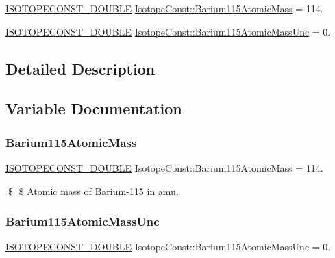 \begin{DoxyCompactItemize}
\item 
\mbox{\hyperlink{group___isotope_const-_macros_ga8f45a7272ce02c0b4c65c44636ed719a}{I\+S\+O\+T\+O\+P\+E\+C\+O\+N\+S\+T\+\_\+\+D\+O\+U\+B\+LE}} \mbox{\hyperlink{group___isotope_const-_barium-_ba115_ga425e8ef7e29b70828f740eba21984690}{Isotope\+Const\+::\+Barium115\+Atomic\+Mass}} = 114.
\item 
\mbox{\hyperlink{group___isotope_const-_macros_ga8f45a7272ce02c0b4c65c44636ed719a}{I\+S\+O\+T\+O\+P\+E\+C\+O\+N\+S\+T\+\_\+\+D\+O\+U\+B\+LE}} \mbox{\hyperlink{group___isotope_const-_barium-_ba115_ga1510a917f523909d1b656311b68f2081}{Isotope\+Const\+::\+Barium115\+Atomic\+Mass\+Unc}} = 0.
\end{DoxyCompactItemize}


\subsection{Detailed Description}


\subsection{Variable Documentation}
\mbox{\label{group___isotope_const-_barium-_ba115_ga425e8ef7e29b70828f740eba21984690}} 
\subsubsection{\texorpdfstring{Barium115\+Atomic\+Mass}{Barium115AtomicMass}}
{\footnotesize\ttfamily \mbox{\hyperlink{group___isotope_const-_macros_ga8f45a7272ce02c0b4c65c44636ed719a}{I\+S\+O\+T\+O\+P\+E\+C\+O\+N\+S\+T\+\_\+\+D\+O\+U\+B\+LE}} Isotope\+Const\+::\+Barium115\+Atomic\+Mass = 114.}

\$ \$ Atomic mass of Barium-\/115 in amu. \mbox{\label{group___isotope_const-_barium-_ba115_ga1510a917f523909d1b656311b68f2081}} 
\subsubsection{\texorpdfstring{Barium115\+Atomic\+Mass\+Unc}{Barium115AtomicMassUnc}}
{\footnotesize\ttfamily \mbox{\hyperlink{group___isotope_const-_macros_ga8f45a7272ce02c0b4c65c44636ed719a}{I\+S\+O\+T\+O\+P\+E\+C\+O\+N\+S\+T\+\_\+\+D\+O\+U\+B\+LE}} Isotope\+Const\+::\+Barium115\+Atomic\+Mass\+Unc = 0.}

